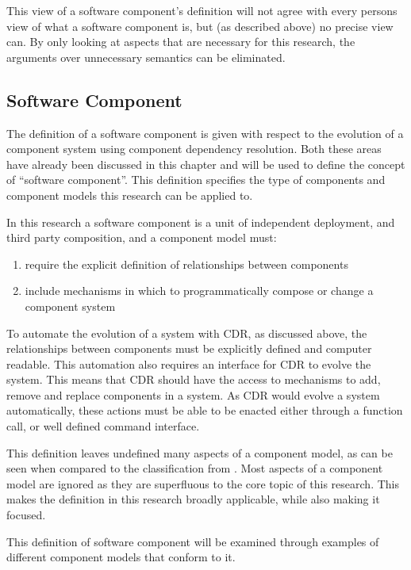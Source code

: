 This view of a software component's definition will not agree with every persons view of what a software component is, but (as described above) no precise view can.
By only looking at aspects that are necessary for this research, the arguments over unnecessary semantics can be eliminated. 

\subsection{Software Component}
The definition of a software component is given with respect to the evolution of a component system using component dependency resolution.
Both these areas have already been discussed in this chapter and will be used to define the concept of ``software component''.
This definition specifies the type of components and component models this research can be applied to.

In this research a software component is a unit of independent deployment, and third party composition,
and a component model must:
\begin{enumerate}
  \item require the explicit definition of relationships between components
  \item include mechanisms in which to programmatically compose or change a component system
\end{enumerate}

To automate the evolution of a system with CDR, as discussed above, the relationships between components must be explicitly defined and computer readable.
This automation also requires an interface for CDR to evolve the system.
This means that CDR should have the access to mechanisms to add, remove and replace components in a system.
As CDR would evolve a system automatically, these actions must be able to be enacted either through a function call, or well defined command interface.

This definition leaves undefined many aspects of a component model, as can be seen when compared to the classification from \citep{Crnkovic2011}.
Most aspects of a component model are ignored as they are superfluous to the core topic of this research.
This makes the definition in this research broadly applicable, while also making it focused.

This definition of software component will be examined through examples of different component models that conform to it.

